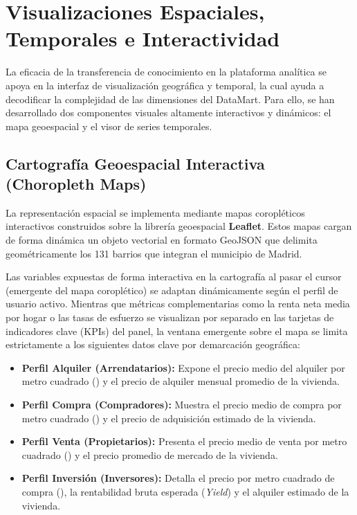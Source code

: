 \documentclass[a4paper,11pt,openany]{book}
\begin{document}
\section{Visualizaciones Espaciales, Temporales e Interactividad}
La eficacia de la transferencia de conocimiento en la plataforma analítica se apoya en la interfaz de visualización geográfica y temporal, la cual ayuda a decodificar la complejidad de las dimensiones del DataMart. Para ello, se han desarrollado dos componentes visuales altamente interactivos y dinámicos: el mapa geoespacial y el visor de series temporales.

\subsection{Cartografía Geoespacial Interactiva (Choropleth Maps)}
La representación espacial se implementa mediante mapas coropléticos interactivos construidos sobre la librería geoespacial \textbf{Leaflet}. Estos mapas cargan de forma dinámica un objeto vectorial en formato GeoJSON que delimita geométricamente los 131 barrios que integran el municipio de Madrid. 

Las variables expuestas de forma interactiva en la cartografía al pasar el cursor (emergente del mapa coroplético) se adaptan dinámicamente según el perfil de usuario activo. Mientras que métricas complementarias como la renta neta media por hogar o las tasas de esfuerzo se visualizan por separado en las tarjetas de indicadores clave (KPIs) del panel, la ventana emergente sobre el mapa se limita estrictamente a los siguientes datos clave por demarcación geográfica:
\begin{itemize}
    \item \textbf{Perfil Alquiler (Arrendatarios):} Expone el precio medio del alquiler por metro cuadrado () y el precio de alquiler mensual promedio de la vivienda.
    \item \textbf{Perfil Compra (Compradores):} Muestra el precio medio de compra por metro cuadrado () y el precio de adquisición estimado de la vivienda.
    \item \textbf{Perfil Venta (Propietarios):} Presenta el precio medio de venta por metro cuadrado () y el precio promedio de mercado de la vivienda.
    \item \textbf{Perfil Inversión (Inversores):} Detalla el precio por metro cuadrado de compra (), la rentabilidad bruta esperada (\textit{Yield}) y el alquiler estimado de la vivienda.
\end{itemize}
\end{document}
